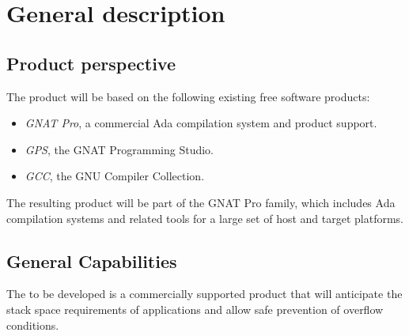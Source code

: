 \chapter{General description}\label{ch:description}

\section{Product perspective}

The \ssat{} product will be based on the following existing free
software products:

\begin{itemize}
\item \emph{GNAT Pro}, a commercial Ada compilation system and product
  support.
\item \emph{GPS}, the GNAT Programming Studio.
\item \emph{GCC}, the GNU Compiler Collection.
\end{itemize}

The resulting product will be part of the GNAT Pro family, which
includes Ada compilation systems and related tools for a large set of
host and target platforms.

\section{General Capabilities}

The \ssat{} to be developed is a commercially supported product that
will anticipate the stack space requirements of applications and allow
safe prevention of overflow conditions.

